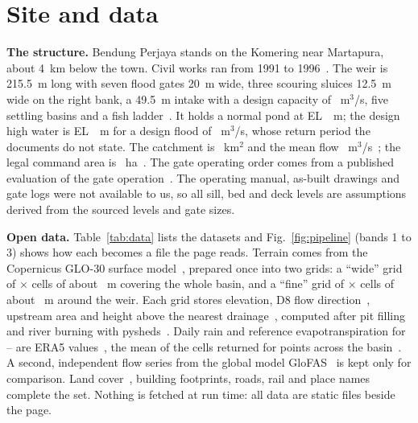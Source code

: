 \documentclass[10pt,a4paper,twocolumn]{extarticle}
\newcommand{\cms}{m$^3$/s}
\newcommand{\kmsq}{km$^2$}
\begin{document}
\section{Site and data}

\textbf{The structure.} Bendung Perjaya stands on the Komering near Martapura, about 4~km below the town. Civil works
ran from 1991 to 1996~\citep{jbic2002}. The weir is 215.5~m long with seven flood gates 20~m wide, three scouring
sluices 12.5~m wide on the right bank, a 49.5~m intake with a design capacity of \IntakeDesign~\cms, five settling
basins and a fish ladder~\citep{jica2019}. It holds a normal pond at EL~\PondNormal~m; the design high water is
EL~\DHW~m for a design flood of \DesignQ~\cms, whose return period the documents do not state. The catchment is
\CatchArea~\kmsq{} and the mean flow \QmeanPub~\cms~\citep{jica1982,jica2022}; the legal command area is
\IrrArea~ha~\citep{permen14}. The gate operating order comes from a published evaluation of the gate
operation~\citep{ayun2022}. The operating manual, as-built drawings and gate logs were not available to us, so all
sill, bed and deck levels are assumptions derived from the sourced levels and gate sizes.

\textbf{Open data.} Table~\ref{tab:data} lists the datasets and Fig.~\ref{fig:pipeline} (bands 1 to 3) shows how each
becomes a file the page reads. Terrain comes from the Copernicus GLO-30 surface
model~\citep{copdem}, prepared once into two grids: a ``wide'' grid of \WideCols$\times$\WideCols{} cells of about
\WideCellM~m covering the whole basin, and a ``fine'' grid of \FineCols$\times$\FineRows{} cells of about
\FineCellM~m around the weir. Each grid stores elevation, D8 flow direction~\citep{ocallaghan1984}, upstream area and
height above the nearest drainage~\citep{renno2008,nobre2011}, computed after pit filling and river burning with
pysheds~\citep{bartos2020}. Daily rain and reference evapotranspiration for \RepYearFirst--\RepYearLast{} are ERA5
values~\citep{hersbach2020}, the mean of the cells returned for \NRainPoints{} points across the
basin~\citep{zippenfenig2023}. A second,
independent flow series from the global model GloFAS~\citep{harrigan2020} is kept only for comparison. Land
cover~\citep{zanaga2022}, \NBuildings{} building footprints, roads, rail and place names~\citep{overture2026}
complete the set. Nothing is fetched at run time: all data are static files beside the page.
\end{document}
